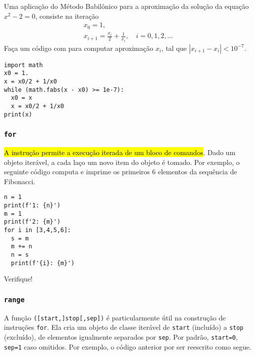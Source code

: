 \begin{exer}
  Uma aplicação do Método Babilônico para a aproximação da solução da equação $x^2-2 = 0$, consiste na iteração
  \begin{gather}
    x_0 = 1,\\
    x_{i+1} = \frac{x_i}{2} + \frac{1}{x_i},\quad i=0,1,2,\ldots
  \end{gather}
  Faça um código com {\PYTHONwhile} para computar aproximação $x_{i}$, tal que $|x_{i+1}-x_{i}|<10^{-7}$.
\end{exer}
\begin{resp}
  
\begin{lstlisting}
import math
x0 = 1.
x = x0/2 + 1/x0
while (math.fabs(x - x0) >= 1e-7):
  x0 = x
  x = x0/2 + 1/x0
print(x)
\end{lstlisting}

\end{resp}

\subsubsection{\texttt{for}}

\hl{A instrução {\PYTHONfor} permite a execução iterada de um bloco de comandos}. Dado um objeto iterável, a cada laço um novo item do objeto é tomado. Por exemplo, o seguinte código computa e imprime os primeiros $6$ elementos da sequência de Fibonacci.

\begin{lstlisting}
n = 1
print(f'1: {n}')
m = 1
print(f'2: {m}')
for i in [3,4,5,6]:
  s = m
  m += n
  n = s
  print(f'{i}: {m}')
\end{lstlisting}

Verifique!

\subsubsection{\texttt{range}}

A função {\PYTHONrange}\texttt{([start,]stop[,sep])} é particularmente útil na construção de instruções \texttt{for}. Ela cria um objeto de classe iterável de \texttt{start} (incluído) a \texttt{stop} (excluído), de elementos igualmente separados por \texttt{sep}. Por padrão, \texttt{start=0}, \texttt{sep=1} caso omitidos. Por exemplo, o código anterior por ser reescrito como segue.

